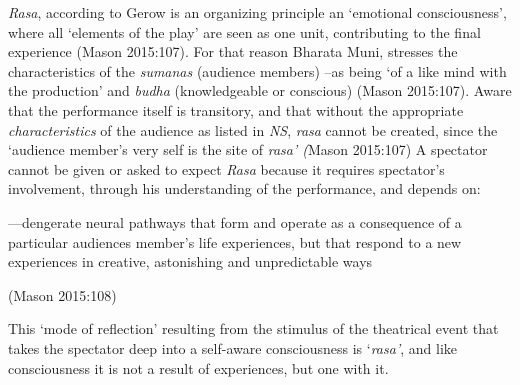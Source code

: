 \textsl{Rasa}, according to Gerow is an organizing principle an ‘emotional consciousness’, where all ‘elements of the play’ are seen as one unit, contributing to the final experience (Mason 2015:107). For that reason Bharata Muni, stresses the characteristics of the \textsl{sumanas} (audience members) –as being ‘of a like mind with the production’ and \textsl{budha} (knowledgeable or conscious) (Mason 2015:107). Aware that the performance itself is transitory, and that without the appropriate \textsl{characteristics} of the audience as listed in \textsl{NS}, \textsl{rasa} cannot be created, since the ‘audience member’s very self is the site of \textsl{rasa’ (}Mason 2015:107) A spectator cannot be given or asked to expect \textsl{Rasa} because it requires spectator’s involvement, through his understanding of the performance, and depends on:

\begin{myquote}
---dengerate neural pathways that form and operate as a consequence of a particular audiences member’s life experiences, but that respond to a new experiences in creative, astonishing and unpredictable ways 

\hfill (Mason 2015:108) 
\end{myquote}

This ‘mode of reflection’ resulting from the stimulus of the theatrical event that takes the spectator deep into a self-aware consciousness is ‘\textsl{rasa’}, and like consciousness it is not a result of experiences, but one with it. 


